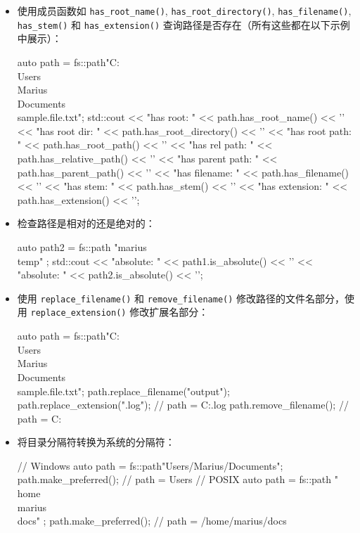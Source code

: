\begin{itemize}
\item
使用成员函数如 \verb|has_root_name()|, \verb|has_root_directory()|, \verb|has_filename()|, \verb|has_stem()| 和 \verb|has_extension()| 查询路径是否存在（所有这些都在以下示例中展示）：

\begin{cpp}
auto path =
    fs::path{"C:\\Users\\Marius\\Documents\\sample.file.txt"};
std::cout
    << "has root: "        << path.has_root_name() << '\n'
    << "has root dir: "    << path.has_root_directory() << '\n'
    << "has root path: "   << path.has_root_path() << '\n'
    << "has rel path: "    << path.has_relative_path() << '\n'
    << "has parent path: " << path.has_parent_path() << '\n'
    << "has filename: "    << path.has_filename() << '\n'
    << "has stem: "        << path.has_stem() << '\n'
    << "has extension: "   << path.has_extension() << '\n';
\end{cpp}

\item
检查路径是相对的还是绝对的：

\begin{cpp}
auto path2 = fs::path{ "marius\\temp" };
std::cout
    << "absolute: " << path1.is_absolute() << '\n'
    << "absolute: " << path2.is_absolute() << '\n';
\end{cpp}

\item
使用 \verb|replace_filename()| 和 \verb|remove_filename()| 修改路径的文件名部分，使用 \verb|replace_extension()| 修改扩展名部分：

\begin{cpp}
auto path =
    fs::path{"C:\\Users\\Marius\\Documents\\sample.file.txt"};
path.replace_filename("output");
path.replace_extension(".log");
// path = C:\Users\Marius\Documents\output.log
path.remove_filename();
// path = C:\Users\Marius\Documents
\end{cpp}

\item
将目录分隔符转换为系统的分隔符：

\begin{cpp}
// Windows
auto path = fs::path{"Users/Marius/Documents"};
path.make_preferred();
// path = Users\Marius\Documents
// POSIX
auto path = fs::path{ "\\home\\marius\\docs" };
path.make_preferred();
// path = /home/marius/docs
\end{cpp}
\end{itemize}

